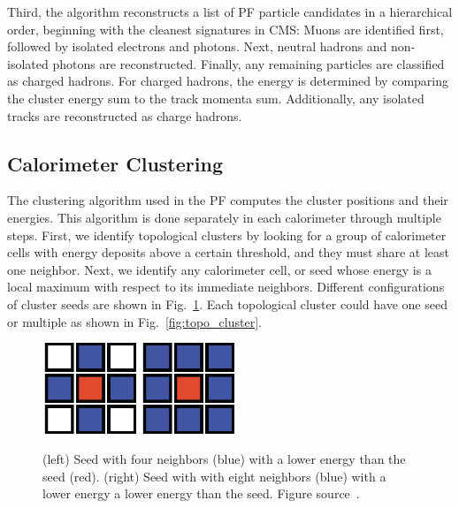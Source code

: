 Third, the algorithm reconstructs a list of PF particle candidates in a hierarchical order, beginning with the cleanest signatures in CMS:
Muons are identified first, followed by isolated electrons and photons. Next, neutral hadrons and non-isolated photons are reconstructed.
Finally, any remaining particles are classified as charged hadrons.
For charged hadrons, the energy is determined by comparing the cluster energy sum to the track momenta sum.
Additionally, any isolated tracks are reconstructed as charge hadrons.

\subsection{Calorimeter Clustering}
\label{subsec:clustering}
The clustering algorithm used in the PF computes the cluster positions and their energies.
This algorithm is done separately in each calorimeter through multiple steps.
First, we identify topological clusters by looking for a group of calorimeter cells with energy deposits above a certain threshold, and they must share at least one neighbor.
Next, we identify any calorimeter cell, or seed whose energy is a local maximum with respect to its immediate neighbors.
Different configurations of cluster seeds are shown in Fig.~\ref{fig:seeds}.
Each topological cluster could have one seed or multiple as shown in Fig.~\ref{fig:topo_cluster}.

\begin{figure}[t!]
\centering
\includegraphics[width=0.25\textwidth]{figures/seed_4neighbours.png}
\includegraphics[width=0.25\textwidth]{figures/seed_8neighbours.png}
\caption[Types of cluster seed]{(left) Seed with four neighbors (blue) with a lower energy than the seed (red). (right) Seed with with eight neighbors (blue) with a lower energy a lower energy than the seed. Figure source~\cite{Clustering}.}
\label{fig:seeds}
\end{figure}

